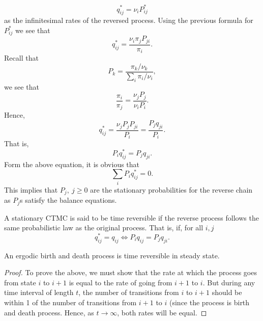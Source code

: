 \documentclass[a4paper,10pt]{article}
\begin{document}
\begin{equation}
q_{ij}^*=\nu_iP_{ij}^*
\end{equation}
as the infinitesimal rates of the reversed process. Using the previous formula for $P_{ij}^*$ we see that
\begin{equation}
q_{ij}^*=\frac{\nu_i\pi_jP_{ji}}{\pi_i}.
\end{equation} 
Recall that 
\begin{equation}
P_{k}=\frac{\pi_k / \nu_k}{\sum_{i}\pi_i / \nu_i},
\end{equation}
we see that 
\begin{equation}
\frac{\pi_i}{\pi_j}=\frac{\nu_j P_j}{\nu_i P_i}.
\end{equation}
Hence, 
\begin{equation}
q_{ij}^*=\frac{\nu_j P_{j}P_{ji}}{P_i}= \frac{P_jq_{ji}}{P_i}.
\end{equation}
That is,
\begin{equation*}
P_{i}q_{ij}^*=P_{j}q_{ji}.
\end{equation*}
Form the above equation, it is obvious that 
\begin{equation*}
\sum_{i}P_i q_{ij}^*=0.
\end{equation*} 
This implies that $P_j,~j \geq 0$ are the stationary probabilities for the reverse chain as $P_j$s satisfy the balance equations.
\begin{defn}
A stationary CTMC is said to be time reversible if the reverse process follows the same probabilistic law as the original process. That is, if, for all $i,j$
\begin{equation*}
q_{ij}^*= q_{ij} \iff P_{i}q_{ij}=P_jq_{ji}.
\end{equation*} 
\end{defn} 
\begin{prop}
An ergodic birth and death process is time reversible in steady state.
\end{prop}
\begin{proof}
To prove the above, we must show that the rate at which the process goes from state $i$ to $i+1$ is equal to the rate of going from $i+1$ to $i$. But during any time interval of length $t$, the number of transitions from $i$ to $i+1$ should be within 1 of the number of transitions from $i+1$ to $i$ (since the process is birth and death process. Hence, as $t \rightarrow \infty$,  both rates will be equal. 
\end{proof}
\end{document}
